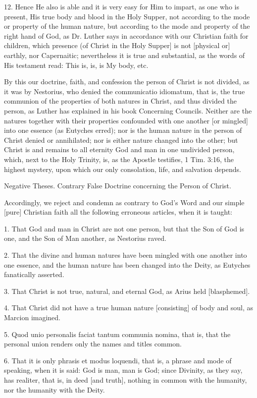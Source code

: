 12. Hence He also is able and it is very easy for Him to impart, as one who is present, His true body and blood in the Holy Supper, not according to the mode or property of the human nature, but according to the mode and property of the right hand of God, as Dr. Luther says in accordance with our Christian faith for children, which presence (of Christ in the Holy Supper] is not [physical or] earthly, nor Capernaitic; nevertheless it is true and substantial, as the words of His testament read: This is, is, is My body, etc.

By this our doctrine, faith, and confession the person of Christ is not divided, as it was by Nestorius, who denied the communicatio idiomatum, that is, the true communion of the properties of both natures in Christ, and thus divided the person, as Luther has explained in his book Concerning Councils. Neither are the natures together with their properties confounded with one another [or mingled] into one essence (as Eutyches erred); nor is the human nature in the person of Christ denied or annihilated; nor is either nature changed into the other; but Christ is and remains to all eternity God and man in one undivided person, which, next to the Holy Trinity, is, as the Apostle testifies, 1 Tim. 3:16, the highest mystery, upon which our only consolation, life, and salvation depends.

Negative Theses.
Contrary False Doctrine concerning the Person of Christ.

Accordingly, we reject and condemn as contrary to God's Word and our simple [pure] Christian faith all the following erroneous articles, when it is taught:

1. That God and man in Christ are not one person, but that the Son of God is one, and the Son of Man another, as Nestorius raved.

2. That the divine and human natures have been mingled with one another into one essence, and the human nature has been changed into the Deity, as Eutyches fanatically asserted.

3. That Christ is not true, natural, and eternal God, as Arius held [blasphemed].

4. That Christ did not have a true human nature [consisting] of body and soul, as Marcion imagined.

5. Quod unio personalis faciat tantum communia nomina, that is, that the personal union renders only the names and titles common.

6. That it is only phrasis et modus loquendi, that is, a phrase and mode of speaking, when it is said: God is man, man is God; since Divinity, as they say, has realiter, that is, in deed [and truth], nothing in common with the humanity, nor the humanity with the Deity.


